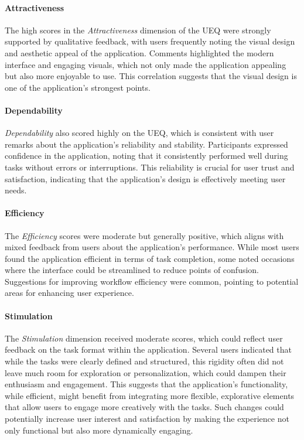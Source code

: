 \paragraph{Attractiveness}
The high scores in the \emph{Attractiveness} dimension of the UEQ were strongly supported by qualitative feedback, with users frequently noting the visual design and aesthetic appeal of the application. 
Comments highlighted the modern interface and engaging visuals, which not only made the application appealing but also more enjoyable to use. 
This correlation suggests that the visual design is one of the application's strongest points.

\paragraph{Dependability}
\emph{Dependability} also scored highly on the UEQ, which is consistent with user remarks about the application’s reliability and stability.
Participants expressed confidence in the application, noting that it consistently performed well during tasks without errors or interruptions. 
This reliability is crucial for user trust and satisfaction, indicating that the application’s design is effectively meeting user needs.

\paragraph{Efficiency}
The \emph{Efficiency} scores were moderate but generally positive, which aligns with mixed feedback from users about the application's performance. 
While most users found the application efficient in terms of task completion, some noted occasions where the interface could be streamlined to reduce points of confusion.
Suggestions for improving workflow efficiency were common, pointing to potential areas for enhancing user experience.

\paragraph{Stimulation}
The \emph{Stimulation} dimension received moderate scores, which could reflect user feedback on the task format within the application. 
Several users indicated that while the tasks were clearly defined and structured, this rigidity often did not leave much room for exploration or personalization, which could dampen their enthusiasm and engagement. 
This suggests that the application's functionality, while efficient, might benefit from integrating more flexible, explorative elements that allow users to engage more creatively with the tasks. 
Such changes could potentially increase user interest and satisfaction by making the experience not only functional but also more dynamically engaging.

